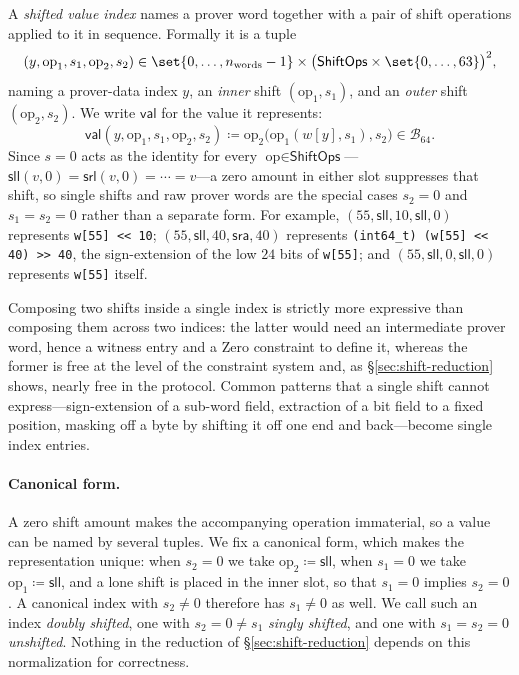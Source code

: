 \documentclass{article}
\theoremstyle{definition}
\newcommand{\BB}{\mathcal{B}}
\begin{document}
A \emph{shifted value index} names a prover word together with a pair of shift operations applied to it in sequence. Formally it is a tuple
\[
  (y, \text{op}_1, s_1, \text{op}_2, s_2) \in \set{0, \ldots, n_\text{words} - 1} \times \bigl( \textsf{ShiftOps} \times \set{0, \ldots, 63} \bigr)^2,
\]
naming a prover-data index $y$, an \emph{inner} shift $(\text{op}_1, s_1)$, and an \emph{outer} shift $(\text{op}_2, s_2)$. We write $\textsf{val}$ for the value it represents:
\[
  \textsf{val}(y, \text{op}_1, s_1, \text{op}_2, s_2) \coloneqq \text{op}_2\bigl( \text{op}_1(w[y], s_1), s_2 \bigr) \in \BB_{64}.
\]
Since $s = 0$ acts as the identity for every $\text{op} \in \textsf{ShiftOps}$---$\textsf{sll}(v, 0) = \textsf{srl}(v, 0) = \cdots = v$---a zero amount in either slot suppresses that shift, so single shifts and raw prover words are the special cases $s_2 = 0$ and $s_1 = s_2 = 0$ rather than a separate form. For example, $(55, \textsf{sll}, 10, \textsf{sll}, 0)$ represents \texttt{w[55] << 10}; $(55, \textsf{sll}, 40, \textsf{sra}, 40)$ represents \texttt{(int64\_t) (w[55] << 40) >> 40}, the sign-extension of the low $24$ bits of \texttt{w[55]}; and $(55, \textsf{sll}, 0, \textsf{sll}, 0)$ represents \texttt{w[55]} itself.

Composing two shifts inside a single index is strictly more expressive than composing them across two indices: the latter would need an intermediate prover word, hence a witness entry and a Zero constraint to define it, whereas the former is free at the level of the constraint system and, as \S\ref{sec:shift-reduction} shows, nearly free in the protocol. Common patterns that a single shift cannot express---sign-extension of a sub-word field, extraction of a bit field to a fixed position, masking off a byte by shifting it off one end and back---become single index entries.

\paragraph{Canonical form.}
A zero shift amount makes the accompanying operation immaterial, so a value can be named by several tuples. We fix a canonical form, which makes the representation unique: when $s_2 = 0$ we take $\text{op}_2 \coloneqq \textsf{sll}$, when $s_1 = 0$ we take $\text{op}_1 \coloneqq \textsf{sll}$, and a lone shift is placed in the inner slot, so that $s_1 = 0$ implies $s_2 = 0$. A canonical index with $s_2 \neq 0$ therefore has $s_1 \neq 0$ as well. We call such an index \emph{doubly shifted}, one with $s_2 = 0 \neq s_1$ \emph{singly shifted}, and one with $s_1 = s_2 = 0$ \emph{unshifted}. Nothing in the reduction of \S\ref{sec:shift-reduction} depends on this normalization for correctness.
\end{document}
